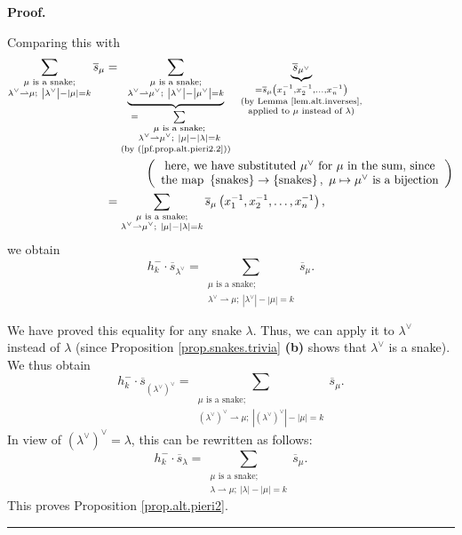 \documentclass[numbers=enddot,12pt,final,onecolumn,notitlepage]{scrartcl}%
\theoremstyle{definition}
\newenvironment{proof}[1][Proof]{\noindent\textbf{#1.} }{\ \rule{0.5em}{0.5em}}
\let\sumnonlimits\sum
\renewcommand{\sum}{\sumnonlimits\limits}
\newenvironment{verlong}{}{}
\begin{document}
\begin{proof}
\begin{verlong}
\end{verlong}

\noindent Comparing this with%
\begin{align*}
\sum_{\substack{\mu\text{ is a snake;}\\\lambda^{\vee}\rightharpoonup
\mu;\ \left\vert \lambda^{\vee}\right\vert -\left\vert \mu\right\vert
=k}}\overline{s}_{\mu}  &  =\underbrace{\sum_{\substack{\mu\text{ is a
snake;}\\\lambda^{\vee}\rightharpoonup\mu^{\vee};\ \left\vert \lambda^{\vee
}\right\vert -\left\vert \mu^{\vee}\right\vert =k}}}_{\substack{=\sum
_{\substack{\mu\text{ is a snake;}\\\lambda^{\vee}\rightharpoonup\mu^{\vee
};\ \left\vert \mu\right\vert -\left\vert \lambda\right\vert =k}}\\\text{(by
(\ref{pf.prop.alt.pieri2.2}))}}}\ \ \underbrace{\overline{s}_{\mu^{\vee}}%
}_{\substack{=\overline{s}_{\mu}\left(  x_{1}^{-1},x_{2}^{-1},\ldots
,x_{n}^{-1}\right)  \\\text{(by Lemma \ref{lem.alt.inverses},}\\\text{applied
to }\mu\text{ instead of }\lambda\text{)}}}\\
&  \ \ \ \ \ \ \ \ \ \ \left(
\begin{array}
[c]{c}%
\text{here, we have substituted }\mu^{\vee}\text{ for }\mu\text{ in the sum,
since}\\
\text{the map }\left\{  \text{snakes}\right\}  \rightarrow\left\{
\text{snakes}\right\}  ,\ \mu\mapsto\mu^{\vee}\text{ is a bijection}%
\end{array}
\right) \\
&  =\sum_{\substack{\mu\text{ is a snake;}\\\lambda^{\vee}\rightharpoonup
\mu^{\vee};\ \left\vert \mu\right\vert -\left\vert \lambda\right\vert
=k}}\overline{s}_{\mu}\left(  x_{1}^{-1},x_{2}^{-1},\ldots,x_{n}^{-1}\right)
,
\end{align*}
we obtain%
\[
h_{k}^{-}\cdot\overline{s}_{\lambda^{\vee}}=\sum_{\substack{\mu\text{ is a
snake;}\\\lambda^{\vee}\rightharpoonup\mu;\ \left\vert \lambda^{\vee
}\right\vert -\left\vert \mu\right\vert =k}}\overline{s}_{\mu}.
\]


We have proved this equality for any snake $\lambda$. Thus, we can apply it to
$\lambda^{\vee}$ instead of $\lambda$ (since Proposition
\ref{prop.snakes.trivia} \textbf{(b)} shows that $\lambda^{\vee}$ is a snake).
We thus obtain%
\[
h_{k}^{-}\cdot\overline{s}_{\left(  \lambda^{\vee}\right)  ^{\vee}}%
=\sum_{\substack{\mu\text{ is a snake;}\\\left(  \lambda^{\vee}\right)
^{\vee}\rightharpoonup\mu;\ \left\vert \left(  \lambda^{\vee}\right)  ^{\vee
}\right\vert -\left\vert \mu\right\vert =k}}\overline{s}_{\mu}.
\]
In view of $\left(  \lambda^{\vee}\right)  ^{\vee}=\lambda$, this can be
rewritten as follows:%
\[
h_{k}^{-}\cdot\overline{s}_{\lambda}=\sum_{\substack{\mu\text{ is a
snake;}\\\lambda\rightharpoonup\mu;\ \left\vert \lambda\right\vert -\left\vert
\mu\right\vert =k}}\overline{s}_{\mu}.
\]
This proves Proposition \ref{prop.alt.pieri2}.
\end{proof}
\end{document}
